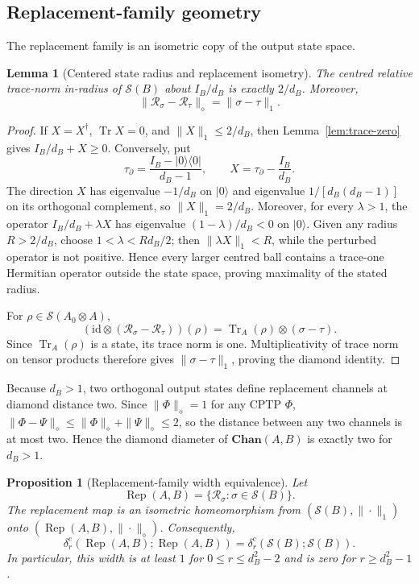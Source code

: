 \documentclass[11pt,a4paper]{article}
\theoremstyle{definition}
\theoremstyle{plain}
\newtheorem{lemma}[theorem]{Lemma}
\newtheorem{proposition}[theorem]{Proposition}
\theoremstyle{remark}
\DeclareMathOperator{\Tr}{Tr}
\newcommand{\Chan}{\mathbf{Chan}}
\newcommand{\Sstate}{\mathcal{S}}
\newcommand{\id}{\mathrm{id}}
\begin{document}
\subsection{Replacement-family geometry}

The replacement family is an isometric copy of the output state space.

\begin{lemma}[Centered state radius and replacement isometry]
\label{lem:replacement}
The centred relative trace-norm in-radius of $\Sstate(B)$ about $I_B/d_B$
is exactly $2/d_B$. Moreover,
\[
\|\mathcal R_\sigma-\mathcal R_\tau\|_\diamond
=\|\sigma-\tau\|_1.
\]
\end{lemma}

\begin{proof}
If $X=X^\dagger$, $\Tr X=0$, and $\|X\|_1\leq2/d_B$, then
Lemma~\ref{lem:trace-zero} gives $I_B/d_B+X\geq0$. Conversely, put
\[
\tau_\partial=\frac{I_B-|0\rangle\langle0|}{d_B-1},
\qquad X=\tau_\partial-\frac{I_B}{d_B}.
\]
The direction $X$ has eigenvalue $-1/d_B$ on $|0\rangle$ and eigenvalue
$1/[d_B(d_B-1)]$ on its orthogonal complement, so $\|X\|_1=2/d_B$.
Moreover, for every $\lambda>1$, the operator
$I_B/d_B+\lambda X$ has eigenvalue $(1-\lambda)/d_B<0$ on
$|0\rangle$. Given any radius $R>2/d_B$, choose
$1<\lambda<Rd_B/2$; then $\|\lambda X\|_1<R$, while the perturbed operator
is not positive. Hence every larger centred ball contains a trace-one
Hermitian operator outside the state space, proving maximality of the stated
radius.

For $\rho\in\Sstate(A_0\otimes A)$,
\[
(\id\otimes(\mathcal R_\sigma-\mathcal R_\tau))(\rho)
=\Tr_A(\rho)\otimes(\sigma-\tau).
\]
Since $\Tr_A(\rho)$ is a state, its trace norm is one. Multiplicativity
of trace norm on tensor products therefore gives
$\|\sigma-\tau\|_1$, proving the diamond identity.
\end{proof}

Because $d_B>1$, two orthogonal output states define replacement channels
at diamond distance two. Since $\|\Phi\|_\diamond=1$ for any CPTP $\Phi$, $\|\Phi-\Psi\|_\diamond\le\|\Phi\|_\diamond+\|\Psi\|_\diamond\le2$, so the distance between any two channels is at most two. Hence the diamond diameter of $\Chan(A,B)$ is exactly two for $d_B>1$.

\begin{proposition}[Replacement-family width equivalence]
\label{prop:replacement-width-equivalence}
Let
\[
\operatorname{Rep}(A,B)=
\{\mathcal R_\sigma:\sigma\in\Sstate(B)\}.
\]
The replacement map is an isometric homeomorphism from
$(\Sstate(B),\|\cdot\|_1)$ onto
$(\operatorname{Rep}(A,B),\|\cdot\|_\diamond)$. Consequently,
\[
\delta_r^{\mathrm c}
(\operatorname{Rep}(A,B);\operatorname{Rep}(A,B))
=
\delta_r^{\mathrm c}(\Sstate(B);\Sstate(B)).
\]
In particular, this width is at least $1$ for
$0\leq r\leq d_B^2-2$ and is zero for $r\geq d_B^2-1$.
\end{proposition}
\end{document}
